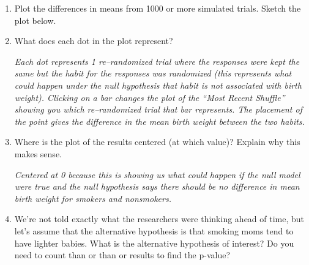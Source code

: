 \begin{enumerate}
           

{\bf Evaluate the Results }

\item  Plot the differences in means from  1000 or more simulated
  trials. Sketch the plot below.
\begin{students}
 \vspace{4cm}
\end{students}

\begin{key}
  {\it }
\end{key}



\item  What does each dot in the plot represent? %
\begin{students}
 \vspace{1cm}
\end{students}

\begin{key}
  {\it Each dot represents 1 re--randomized trial where the responses
   were kept the same but the habit for the responses
   was randomized (this represents what could happen under the null
   hypothesis that habit is not associated with
   birth weight).  Clicking on a bar changes the
   plot of the “Most Recent Shuffle” showing you which
   re--randomized trial that bar represents.  The placement
   of the point gives the difference in the mean birth
   weight between the two habits. }
\end{key}

   
\item  Where is the plot of the results centered (at which value)?
  Explain why this makes sense.
\begin{students}
 \vspace{3cm}
\end{students}

\begin{key}
  {\it  Centered at 0 because this is showing us what could happen if the
  null model were true and the null hypothesis says there should be
  no difference in mean birth weight for smokers and nonsmokers. }
\end{key}


\item  We're not told exactly what the researchers were thinking ahead
  of time, but let's assume that the alternative hypothesis is that
  smoking moms tend to have lighter babies.   What is the alternative
  hypothesis of interest? Do you need to count  than or
    than or  results to find the p-value? 
 

\end{enumerate}
